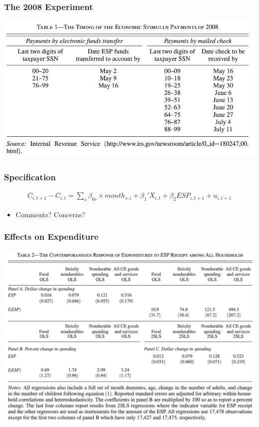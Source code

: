 \documentclass[english,xcolor=svgnames]{beamer}
\begin{document}
\begin{frame}
\frametitle[alignment=center]{The 2008 Experiment}
\centering
\includegraphics[scale=0.6]{figures/PSMJTAB1.png}
\end{frame}

\begin{frame}
\frametitle[alignment=center]{Specification}
\begin{align*}
	C_{i,t+1}-C_{i,t} = \sum_s \beta_{0s} \times month_{s,i} + \beta_1'X_{i,t} + \beta_2 ESP_{i,t+1} + u_{i,t+1}
\end{align*}
\begin{itemize}
	\item Comments? Concerns?
\end{itemize}
\end{frame}

\begin{frame}
\frametitle[alignment=center]{Effects on Expenditure}
\centering
\includegraphics[scale=0.6]{figures/PSMJTAB2.png}
\end{frame}
\end{document}
